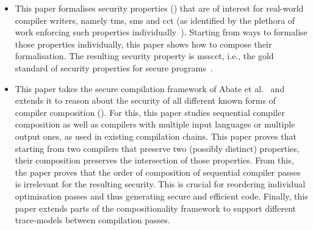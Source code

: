 \documentclass[dvipsnames,conference]{IEEEtran}
\theoremstyle{definition}
\begin{document}
\begin{itemize}
  \item %
        This paper formalises security properties () that are of interest for real-world compiler writers, namely \gls*{tms}, \gls*{sms} and \gls*{cct} (as identified by the plethora of work enforcing such properties individually~\cite{akritidis2009baggy,nagarakatte2009soft,nagarakatte2010cets,dhumbumroong2020boundwarden,jung2021pico,nam2019framer,shankaranarayana2023tailcheck,younan2010paricheck,zhou2023fatptrs,bond2017vale,almeida2017jasmin,kuepper2023cryptopt,cauligi2019fact}).
        Starting from ways to formalise those properties individually, this paper shows how to compose their formalisation.
        The resulting security property is \gls*{msscct}, i.e., the gold standard of security properties for secure programs~\cite{lemay2021ccc}.


  \item %
        This paper takes the secure compilation framework of Abate et al.~\cite{abate2019jour} and extends it to reason about the security of all different known forms of compiler composition ().
        For this, this paper studies sequential compiler composition as well as compilers with multiple input languages or multiple output ones, as used in existing compilation chains.
        This paper proves that starting from two compilers that preserve two (possibly distinct) properties, their composition preserves the intersection of those properties.
        From this, the paper proves that the order of composition of sequential compiler passes is irrelevant for the resulting security.
        This is crucial for reordering individual optimisation passes and thus generating secure and efficient code.
        Finally, this paper extends parts of the compositionality framework to support different trace-models between compilation passes.


\end{itemize}
\end{document}
